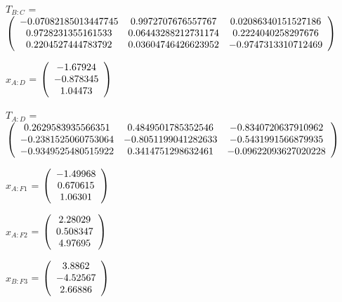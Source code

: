 \begin{description}
$T_{B:C}$ = $\left( \begin{array} {ccc}
   -0.07082185013447745 & 0.9972707676557767 & 0.02086340151527186 \\
   0.9728231355161533 & 0.06443288212731174 & 0.2224040258297676 \\
   0.2204527444783792 & 0.03604746426623952 & -0.9747313310712469 \\
\end{array} \right)\\ \\$

$x_{A:D}$ = $\left( \begin{array} {ccc}   -1.67924 \\  -0.878345 \\    1.04473
\end{array} \right)\\ \\$

$T_{A:D}$ = $\left( \begin{array} {ccc}
   0.2629583935566351 & 0.4849501785352546 & -0.8340720637910962 \\
   -0.2381525060753064 & -0.8051199041282633 & -0.5431991566879935 \\
   -0.9349525480515922 & 0.3414751298632461 & -0.09622093627020228 \\
\end{array} \right)\\ \\$

$x_{A:F1}$ = $\left( \begin{array} {ccc}   -1.49968 \\   0.670615 \\    1.06301
\end{array} \right)\\ \\$

$x_{A:F2}$ = $\left( \begin{array} {ccc}    2.28029 \\   0.508347 \\    4.97695
\end{array} \right)\\ \\$

$x_{B:F3}$ = $\left( \begin{array} {ccc}     3.8862 \\   -4.52567 \\    2.66886
\end{array} \right)\\ \\$


\end{description}
